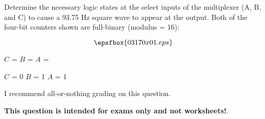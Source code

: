 

Determine the necessary logic states at the select inputs of the multiplexer (A, B, and C) to cause a 93.75 Hz square wave to appear at the output.  Both of the four-bit counters shown are full-binary (modulus = 16):

$$\epsfbox{03170x01.eps}$$

$C$ = \hskip 30pt $B$ = \hskip 30pt $A$ =







$C$ = 0 \hskip 30pt $B$ = 1 \hskip 30pt $A$ = 1

\vskip 10pt

I recommend all-or-nothing grading on this question.







{\bf This question is intended for exams only and not worksheets!}.




